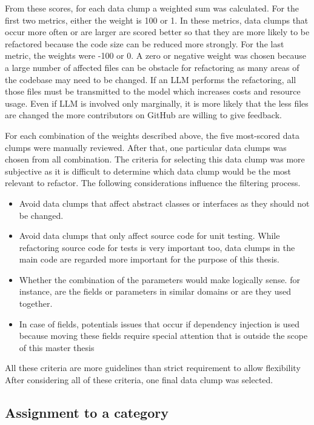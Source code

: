From these scores, for each data clump a weighted sum was calculated. For the first two metrics, either the weight is 100 or 1. In these metrics, data clumps that occur more often or are larger are scored better so that they are more likely to be refactored because the code size can be reduced more strongly.  For the last metric, the weights were -100 or 0. A zero or negative weight was chosen because a large number of affected files can be obstacle for  refactoring as many areas of the codebase may need to be changed. If an \ac{LLM} performs the refactoring, all those files must be transmitted to the model which increases costs and resource usage. Even if \ac{LLM} is involved only marginally, it is more likely that the less files are changed the more contributors on GitHub are willing to give feedback.

For each combination of the weights described above, the five most-scored data clumps were manually reviewed. After that, one particular data clumps was  chosen from all combination. The criteria for selecting this data clump was more subjective as it is difficult to determine which data clump would be  the most relevant to refactor. The following considerations influence the filtering process.

\begin{itemize}
    \item Avoid data clumps that affect abstract classes or interfaces as they should not be changed.
    \item Avoid data clumps that only affect source code for unit testing. While refactoring source code for tests is very important too, data clumps in the main code are regarded more important for the purpose of this thesis.
    \item Whether the combination of the parameters would make logically sense. for instance, are the fields or parameters in similar domains or are they used together. 
    \item In case of fields, potentials issues that occur if dependency injection is used because moving these fields require special attention that is outside the scope of this master thesis
\end{itemize}
All these criteria are more guidelines than strict requirement to allow flexibility 
After considering all of these criteria, one final data clump was selected.

\subsection{Assignment to a category}

